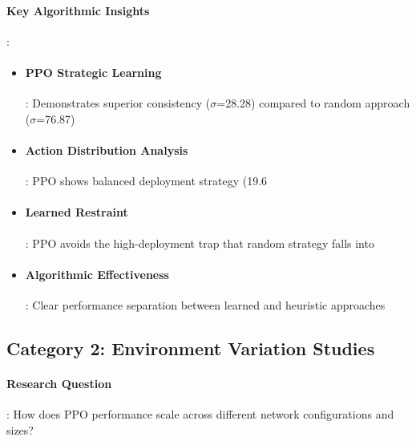 \documentclass[12pt,oneside]{article}
\begin{document}
\paragraph{Key Algorithmic Insights}:
\begin{itemize}
\item \paragraph{PPO Strategic Learning}: Demonstrates superior consistency ($\sigma$=28.28) compared to random approach ($\sigma$=76.87)
\item \paragraph{Action Distribution Analysis}: PPO shows balanced deployment strategy (19.6%
\item \paragraph{Learned Restraint}: PPO avoids the high-deployment trap that random strategy falls into
\item \paragraph{Algorithmic Effectiveness}: Clear performance separation between learned and heuristic approaches
\end{itemize}

\subsection{Category 2: Environment Variation Studies}

\paragraph{Research Question}: How does PPO performance scale across different network configurations and sizes?
\end{document}
